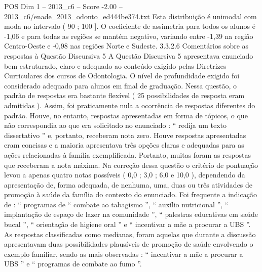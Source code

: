 \begin{textsample}{POS Dim 1 – 2013\_c6 – Score -2.00 – 2013\_c6/enade\_2013\_odonto\_ed444be374.txt}
Esta distribuição é unimodal com moda no intervalo ( 90 ; 100 ].
O coeficiente de assimetria para todos os alunos é -1,06 e para todas as regiões se mantém negativo, variando entre -1,39 na região Centro-Oeste e -0,98 nas regiões Norte e Sudeste. 3.3.2.6 Comentários sobre as respostas à Questão Discursiva 5 A Questão Discursiva 5 apresentava enunciado bem estruturado, claro e adequado ao conteúdo exigido pelas Diretrizes Curriculares dos cursos de Odontologia.
O nível de profundidade exigido foi considerado adequado para alunos em final de graduação.
Nessa questão, o padrão de respostas era bastante flexível ( 25 possibilidades de resposta eram admitidas ).
Assim, foi praticamente nula a ocorrência de respostas diferentes do padrão.
Houve, no entanto, respostas apresentadas em forma de tópicos, o que não correspondia ao que era solicitado no enunciado : “ redija um texto dissertativo ” e, portanto, receberam nota zero.
Houve respostas apresentadas eram concisas e a maioria apresentava três opções claras e adequadas para as ações relacionadas à família exemplificada.
Portanto, muitas foram as respostas que receberam a nota máxima.
Na correção dessa questão o critério de pontuação levou a apenas quatro notas possíveis ( 0,0 ; 3,0 ; 6,0 e 10,0 ), dependendo da apresentação de, forma adequada, de nenhuma, uma, duas ou três atividades de promoção à saúde da família do contexto do enunciado.
Foi frequente a indicação de : “ programas de “ combate ao tabagismo ”, “ auxílio nutricional ”, “ implantação de espaço de lazer na comunidade ”, “ palestras educativas em saúde bucal ”, “ orientação de higiene oral ” e “ incentivar a mãe a procurar a UBS ”.
As respostas classificadas como medianas, foram aquelas que durante a discussão apresentavam duas possibilidades plausíveis de promoção de saúde envolvendo o exemplo familiar, sendo as mais observadas : “ incentivar a mãe a procurar a UBS ” e “ programas de combate ao fumo ”.

\end{textsample}
